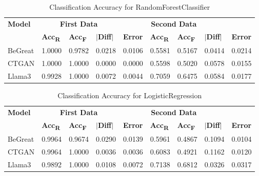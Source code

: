 \begin{table}[H]
    \centering
    \caption{Classification Accuracy for RandomForestClassifier}
    \label{tab:random_forest_accuracy_combined}
    \begin{tabularx}{\textwidth}{l*{8}{X}}
        \toprule
        \textbf{Model} & \multicolumn{3}{c}{\textbf{First Data}} & \multicolumn{4}{c}{\textbf{Second Data}} \\
        \cmidrule(lr){2-4} \cmidrule(lr){5-8}
        & \textbf{Acc\textsubscript{R}} & \textbf{Acc\textsubscript{F}} & \textbf{$|$Diff$|$} & \textbf{Error} & \textbf{Acc\textsubscript{R}} & \textbf{Acc\textsubscript{F}} & \textbf{$|$Diff$|$} & \textbf{Error} \\
        \midrule
        BeGreat & 1.0000 & 0.9782 & 0.0218 & 0.0106 & 0.5581 & 0.5167 & 0.0414 & 0.0214 \\
        CTGAN & 1.0000 & 1.0000 & 0.0000 & 0.0000 & 0.5598 & 0.5020 & 0.0578 & 0.0155 \\
        Llama3 & 0.9928 & 1.0000 & 0.0072 & 0.0044 & 0.7059 & 0.6475 & 0.0584 & 0.0177 \\
        \bottomrule
    \end{tabularx}
\end{table}



\begin{table}[H]
    \centering
    \caption{Classification Accuracy for LogisticRegression}
    \label{tab:logistic_regression_accuracy_combined}
    \begin{tabularx}{\textwidth}{l*{8}{X}}
        \toprule
        \textbf{Model} & \multicolumn{3}{c}{\textbf{First Data}} & \multicolumn{4}{c}{\textbf{Second Data}} \\
        \cmidrule(lr){2-4} \cmidrule(lr){5-8}
        & \textbf{Acc\textsubscript{R}} & \textbf{Acc\textsubscript{F}} & \textbf{$|$Diff$|$} & \textbf{Error} & \textbf{Acc\textsubscript{R}} & \textbf{Acc\textsubscript{F}} & \textbf{$|$Diff$|$} & \textbf{Error} \\
        \midrule
        BeGreat & 0.9964 & 0.9674 & 0.0290 & 0.0139 & 0.5961 & 0.4867 & 0.1094 & 0.0104 \\
        CTGAN & 0.9964 & 1.0000 & 0.0036 & 0.0036 & 0.6083 & 0.4921 & 0.1162 & 0.0120 \\
        Llama3 & 0.9892 & 1.0000 & 0.0108 & 0.0072 & 0.7138 & 0.6812 & 0.0326 & 0.0317 \\
        \bottomrule
    \end{tabularx}
\end{table}
    
    
